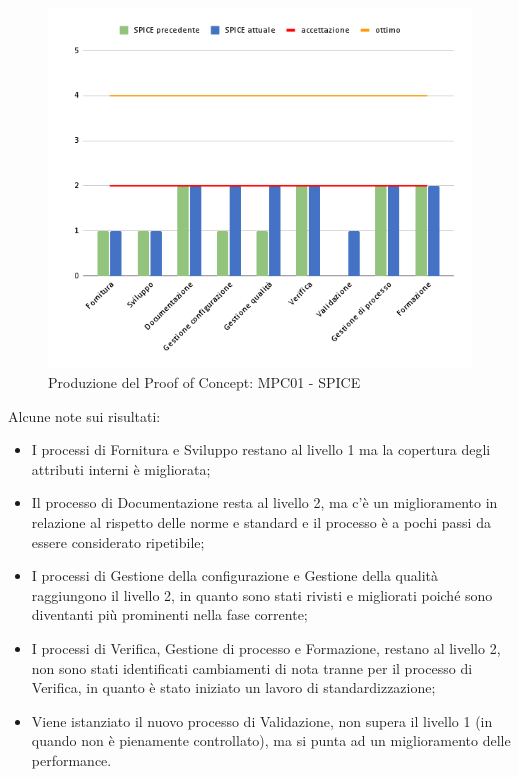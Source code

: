 \begin{figure}[H]
    \centering
    \includegraphics[scale=0.50]{Sezioni/images/poc-spice.png}
    \caption{Produzione del Proof of Concept: MPC01 - SPICE}
\end{figure}

   Alcune note sui risultati:
\begin{itemize}
\item I processi di Fornitura e Sviluppo restano al livello 1 ma la copertura degli attributi interni è migliorata;
\item Il processo di Documentazione resta al livello 2, ma c'è un miglioramento in relazione al rispetto delle norme e standard e il processo è a pochi passi da essere considerato ripetibile;
\item I processi di Gestione della configurazione e Gestione della qualità raggiungono il livello 2, in quanto sono stati rivisti e migliorati poiché sono diventanti più prominenti nella fase corrente;
\item I processi di Verifica, Gestione di processo e Formazione, restano al livello 2, non sono stati identificati cambiamenti di nota tranne per il processo di Verifica, in quanto è stato iniziato un lavoro di standardizzazione; 
\item Viene istanziato il nuovo processo di Validazione, non supera il livello 1 (in quando non è pienamente controllato), ma si punta ad un miglioramento delle performance.
\end{itemize}   


